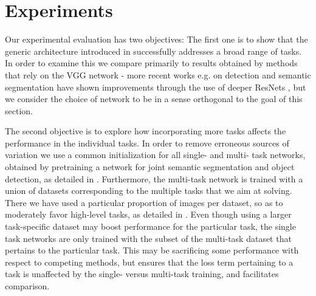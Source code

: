 \documentclass[10pt,twocolumn,letterpaper]{article}
\begin{document}
 
 













\section{Experiments}

 

Our experimental evaluation has two objectives:
The first one is to show that the generic \ubernet architecture  introduced in  successfully addresses a broad range of tasks.
In order to examine this we compare primarily to results obtained by methods that rely on the VGG network \cite{simonyan2014very} - more recent works e.g. on detection \cite{DaiLHS16} and semantic segmentation \cite{ChenPK0Y16} have shown improvements through the use of deeper ResNets \cite{HeZRS15}, but we consider the choice of network to be in a sense orthogonal to the goal of this section. 

The second objective is to explore how incorporating more tasks affects the  performance in the individual tasks. In order to remove erroneous sources of variation we use a common initialization for all single- and multi- task networks, obtained by pretraining a network for joint semantic segmentation and object detection, as detailed in . Furthermore, the multi-task network is trained with a union of datasets corresponding to the multiple tasks that we aim at solving. There we have used a particular proportion  of images per dataset, so as to moderately favor high-level tasks, as detailed in . Even though using a larger task-specific dataset may boost performance for the particular task, the single task networks are only trained with the subset of the multi-task dataset that pertains to the particular task. 
This may be sacrificing some performance with respect to competing methods, but ensures that the loss term pertaining to a task is unaffected by the single- versus multi-task training, and facilitates comparison. 
\end{document}
